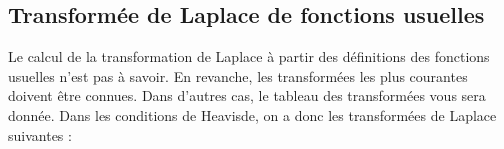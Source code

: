 \documentclass[10pt,fleqn]{article} %
\begin{document}




\subsection{Transformée de Laplace de fonctions usuelles}
Le calcul de la transformation de Laplace à partir des définitions des fonctions usuelles n'est pas à savoir. En revanche, les transformées les plus courantes doivent être connues. Dans d'autres cas, le tableau des transformées vous sera donnée.
Dans les conditions de Heavisde, on a donc les transformées de Laplace suivantes :
\end{document}
